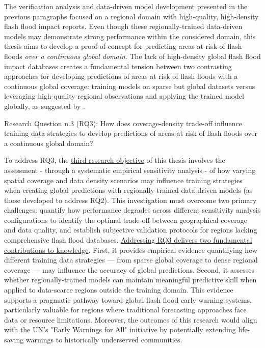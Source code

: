 The  verification analysis and data-driven model development presented in the previous paragraphs focused on a regional domain with high-quality, high-density flash flood impact reports. Even though these regionally-trained data-driven models may demonstrate strong performance within the considered domain, this thesis aims to develop a proof-of-concept for predicting areas at risk of flash floods \textit{over a continuous global domain}. The lack of high-density global flash flood impact databases \citep{Panwar_2020} creates a fundamental tension between two contrasting approaches for developing predictions of areas at risk of flash floods with a continuous global coverage: training models on sparse but global datasets versus leveraging high-quality regional observations and applying the trained model globally, as suggested by \citet{Kratzert_2024}. 

\begin{tcolorbox}[
  colframe=colour_chapter7,  
  colback=white,           
  sharp corners,        
  boxrule=2mm,          
  left=0mm,             
  right=0mm,            
  toprule=0mm,          
  bottomrule=0mm,       
  rightrule=2mm        
]
{\color{colour_chapter7} {\setlength{\parindent}{1.0em} Research Question n.3 (RQ3): How does coverage-density trade-off influence training data strategies to develop predictions of areas at risk of flash floods over a continuous global domain?}}
\end{tcolorbox}

\noindent To address RQ3, the \uline{third research objective} of this thesis involves the assessment - through a systematic empirical sensitivity analysis - of how varying spatial coverage and data density scenarios may influence training strategies when creating global predictions with regionally-trained data-driven models (as those developed to address RQ2). This investigation must overcome two primary challenges: quantify how performance degrades across different sensitivity analysis configurations to identify the optimal trade-off between geographical coverage and data quality, and establish subjective validation protocols for regions lacking comprehensive flash flood databases. \uline{Addressing RQ3 delivers two fundamental contributions to knowledge}. First, it provides empirical evidence quantifying how different training data strategies — from sparse global coverage to dense regional coverage — may influence the accuracy of global predictions. Second, it assesses whether regionally-trained models can maintain meaningful predictive skill when applied to data-scarce regions outside the training domain. This evidence supports a pragmatic pathway toward global flash flood early warning systems, particularly valuable for regions where traditional forecasting approaches face data or resource limitations. Moreover, the outcomes of this research would align with the UN's "Early Warnings for All" initiative by potentially extending life-saving warnings to historically underserved communities.

